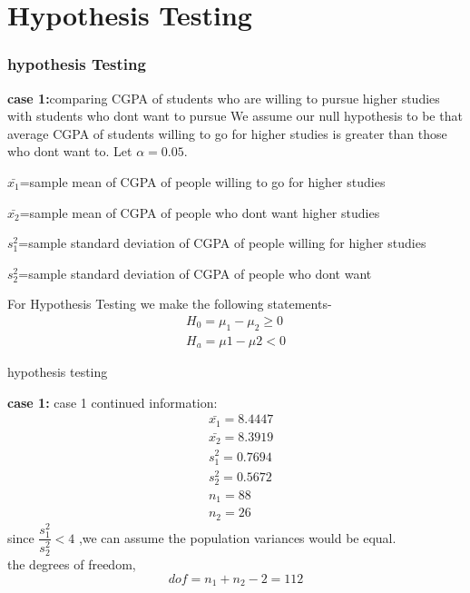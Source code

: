 \documentclass{beamer}
\begin{document}
\section{Hypothesis Testing}
\begin{frame}
  \frametitle{hypothesis Testing}
  \begin{block}{\textbf{case 1:}{comparing CGPA of students who are willing to pursue higher studies with students who dont want to pursue  }}
     We assume our null hypothesis to be that average CGPA of students willing to go for higher studies is  greater than those who dont want to. Let $\alpha = 0.05$.
     \begin{enumerate*}
         \item  $\bar{x_1}$=sample mean of CGPA of people willing to go for higher studies\\
         \item  $\bar{x_2}$=sample mean of CGPA of people who  dont want higher studies\\
         \item  $s^2_1$=sample standard deviation of CGPA of people willing for higher studies\\
         \item  $s^2_2$=sample standard deviation of CGPA of people who  dont want \\
     \end{enumerate*}
   For Hypothesis Testing we make the following statements- 
      \begin{align*}
          H_0=\mu_1-\mu_2\geq0\\
          H_a=\mu1-\mu2<0
      \end{align*}
        \end{block}
    \end{frame}
    \begin{frame}{hypothesis testing}
        \begin{block}{\textbf{case 1:}{ case 1 continued}}
            information:
             \begin{align}
                 &\bar{x_1}=8.4447\\
                 &\bar{x_2}=8.3919\\
                 &s^2_1=0.7694\\
                 &s^2_2=0.5672\\
                 &n_1=88\\
                 &n_2=26
             \end{align}
       since $\dfrac{s^2_1}{s^2_2}<4$ ,we can assume the population variances would be equal. \\
       the degrees of freedom, $$dof=n_1+n_2-2=112$$
        \end{block}
    \end{frame}
\end{document}
